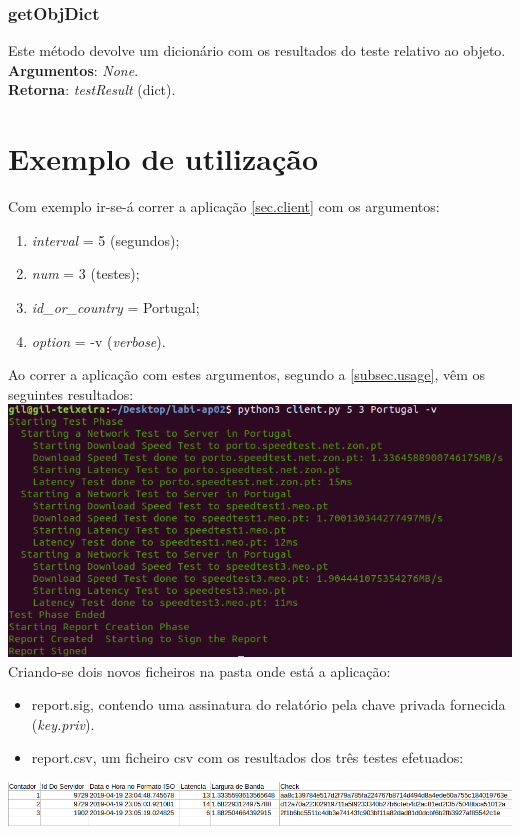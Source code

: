 \documentclass{report}
\begin{document}
\subsection{getObjDict}
Este método devolve um dicionário com os resultados do teste relativo ao objeto.
\textbf{Argumentos}: \textit{None}.\\
\textbf{Retorna}: \textit{testResult} (dict).

\chapter{Exemplo de utilização}
\label{chap:example}
Com exemplo ir-se-á correr a aplicação \autoref{sec.client} com os argumentos:
\begin{enumerate}
\item \textit{interval} = 5 (segundos);
\item \textit{num} = 3 (testes);
\item \textit{id\_or\_country} = Portugal;
\item \textit{option} = -v (\textit{verbose}).
\end{enumerate}
Ao correr a aplicação com estes argumentos, segundo a \autoref{subsec.usage}, vêm os seguintes resultados:\\
\includegraphics[width=\textwidth]{useExample}
Criando-se dois novos ficheiros na pasta onde está a aplicação:
\begin{itemize}
\item report.sig, contendo uma assinatura do relatório pela chave privada fornecida (\textit{key.priv}).
\item report.csv, um ficheiro \ac{csv} com os resultados dos três testes efetuados:
\end{itemize}
\includegraphics[width=\textwidth]{reportcsv}
\end{document}

